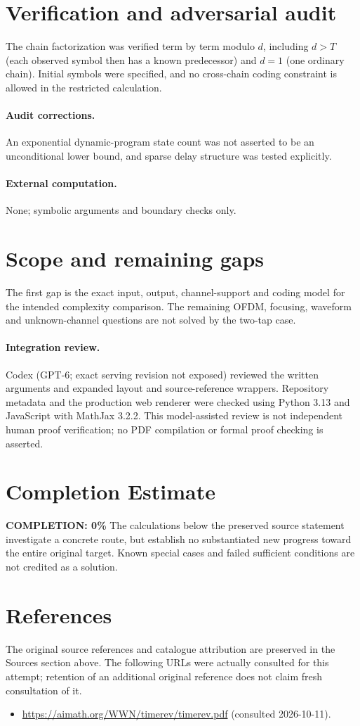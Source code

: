 \documentclass[11pt]{article}
\begin{document}
\section{Verification and adversarial audit}
The chain factorization was verified term by term modulo $d$, including
$d>T$ (each observed symbol then has a known predecessor) and $d=1$ (one
ordinary chain). Initial symbols were specified, and no cross-chain coding
constraint is allowed in the restricted calculation.
\paragraph{Audit corrections.} An exponential dynamic-program state count was not asserted to be an unconditional lower bound, and sparse delay structure was tested explicitly.
\paragraph{External computation.} None; symbolic arguments and boundary checks only.
\section{Scope and remaining gaps}
The first gap is the exact input, output, channel-support and coding model
for the intended complexity comparison. The remaining OFDM, focusing,
waveform and unknown-channel questions are not solved by the two-tap case.
\paragraph{Integration review.} Codex (GPT-6; exact serving revision not exposed) reviewed the written arguments and expanded layout and source-reference wrappers. Repository metadata and the production web renderer were checked using Python 3.13 and JavaScript with MathJax 3.2.2. This model-assisted review is not independent human proof verification; no PDF compilation or formal proof checking is asserted.

\section{Completion Estimate}
\noindent\textbf{COMPLETION: 0\%}
The calculations below the preserved source statement investigate a concrete route,
but establish no substantiated new progress toward the entire original target.
Known special cases and failed sufficient conditions are not credited as a solution.
\section{References}
The original source references and catalogue attribution are preserved in the
Sources section above. The following URLs were actually consulted for this attempt;
retention of an additional original reference does not claim fresh consultation of it.
\begin{itemize}
\item \url{https://aimath.org/WWN/timerev/timerev.pdf} (consulted 2026-10-11). 
\end{itemize}
\end{document}
